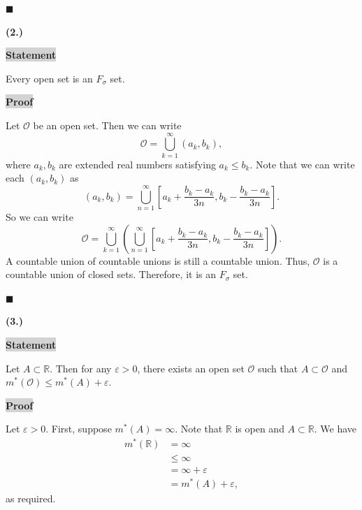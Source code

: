 \documentclass[12pt]{article}
\newcommand{\mybox}{%
    \collectbox{%
        \setlength{\fboxsep}{2pt}%
        \fbox{\BOXCONTENT}%
    }%
}
\begin{document}
\hfill$\blacksquare$

\pagebreak

\noindent \textbf{(2.)} 

\vspace{3mm}

\noindent\mybox{\colorbox{lightgray}{\textbf{Statement}}}\hspace{3mm}\hrulefill 

\noindent Every open set is an $F_{\sigma}$ set. 

\vspace{5mm}

\noindent\mybox{\colorbox{lightgray}{\textbf{Proof}}}\hspace{3mm}\hrulefill

Let $\mathcal{O}$ be an open set. Then we can write $$\mathcal{O} = \bigcup\limits_{k=1}^{\infty}(a_k, b_k),$$ where $a_k,b_k$ are extended real numbers satisfying $a_k\leq b_k.$ Note that we can write each $(a_k, b_k)$ as
$$
(a_k, b_k) = \bigcup\limits_{n=1}^{\infty}\left[a_k + \frac{b_k-a_k}{3n}, b_k - \frac{b_k-a_k}{3n}\right].
$$
So we can write 
$$
\mathcal{O} = \bigcup_{k=1}^{\infty}\left(\bigcup\limits_{n=1}^{\infty}\left[a_k + \frac{b_k-a_k}{3n}, b_k - \frac{b_k-a_k}{3n}\right]\right).
$$
A countable union of countable unions is still a countable union. Thus, $\mathcal{O}$ is a countable union of closed sets. Therefore, it is an $F_{\sigma}$ set.

\vspace{3mm}

\hfill$\blacksquare$

\pagebreak

\noindent \textbf{(3.)}

\vspace{3mm}

\noindent\mybox{\colorbox{lightgray}{\textbf{Statement}}}\hspace{3mm}\hrulefill

\noindent Let $A\subset \mathbb{R}$. Then for any $\varepsilon>0$, there exists an open set $\mathcal{O}$ such that $A\subset \mathcal{O}$ and $m^{*}(\mathcal{O})\leq m^{*}(A) + \varepsilon$.

\vspace{5mm}

\noindent\mybox{\colorbox{lightgray}{\textbf{Proof}}}\hspace{3mm}\hrulefill

Let $\varepsilon > 0$. First, suppose $m^{*}(A) = \infty$. Note that $\mathbb{R}$ is open and $A\subset\mathbb{R}$. We have
\begin{align*}
    m^{*}(\mathbb{R}) &= \infty \\
    &\leq \infty \\
    &= \infty + \varepsilon \\
    &= m^{*}(A) + \varepsilon,
\end{align*}
as required. 
\end{document}
